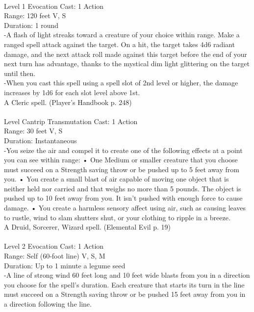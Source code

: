 \documentclass[10pt,twocolumn]{report}
\begin{document}
 \\
Level 1 \quad Evocation \quad Cast: 1 Action\\
Range: 120 feet \quad V, S\\
Duration: 1 round \quad \\
-A flash of light streaks toward a creature of your choice within range.
Make a ranged spell attack against the target. On a hit, the target takes 4d6 radiant damage, and the next attack roll made against this target before the end of your next turn has advantage, thanks to the mystical dim light glittering on the target until then.\\
-When you cast this spell using a spell slot of 2nd level or higher, the damage increases by 1d6 for each slot level above 1st.\\
A Cleric spell. (Player's Handbook p. 248) \\


 \\
Level Cantrip \quad Transmutation \quad Cast: 1 Action\\
Range: 30 feet \quad V, S\\
Duration: Instantaneous \quad \\
-You seize the air and compel it to create one of the following effects at a point you can see within range:
• One Medium or smaller creature that you choose must succeed on a Strength saving throw or be pushed up to 5 feet away from you.
• You create a small blast of air capable of moving one object that is neither held nor carried and that weighs no more than 5 pounds. The object is pushed up to 10 feet away from you. It isn’t pushed with enough force to cause damage.
• You create a harmless sensory affect using air, such as causing leaves to rustle, wind to slam shutters shut, or your clothing to ripple in a breeze.\\
A Druid, Sorcerer, Wizard spell. (Elemental Evil p. 19) \\


 \\
Level 2 \quad Evocation \quad Cast: 1 Action\\
Range: Self (60-foot line) \quad V, S, M\\
Duration: Up to 1 minute \quad a legume seed\\
-A line of strong wind 60 feet long and 10 feet wide blasts from you in a direction you choose for the spell’s duration. Each creature that starts its turn in the line must succeed on a Strength saving throw or be pushed 15 feet away from you in a direction following the line.
\end{document}
